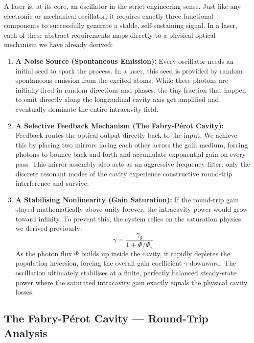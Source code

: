 A laser is, at its core, an oscillator in the strict engineering sense. Just like any electronic or mechanical oscillator, it requires exactly three functional components to successfully generate a stable, self-sustaining signal. In a laser, each of these abstract requirements maps directly to a physical optical mechanism we have already derived:

\begin{enumerate}
    \item \textbf{A Noise Source (Spontaneous Emission):} Every oscillator needs an initial seed to spark the process. In a laser, this seed is provided by random spontaneous emission from the excited atoms. While these photons are initially fired in random directions and phases, the tiny fraction that happen to emit directly along the longitudinal cavity axis get amplified and eventually dominate the entire intracavity field.

    \item \textbf{A Selective Feedback Mechanism (The Fabry-P\'{e}rot Cavity):} Feedback routes the optical output directly back to the input. We achieve this by placing two mirrors facing each other across the gain medium, forcing photons to bounce back and forth and accumulate exponential gain on every pass. This mirror assembly also acts as an aggressive frequency filter: only the discrete resonant modes of the cavity experience constructive round-trip interference and survive.

    \item \textbf{A Stabilising Nonlinearity (Gain Saturation):} If the round-trip gain stayed mathematically above unity forever, the intracavity power would grow toward infinity. To prevent this, the system relies on the saturation physics we derived previously:
          \begin{equation*}
              \gamma = \frac{\gamma_0}{1 + \Phi/\Phi_s}
          \end{equation*}
          As the photon flux $\Phi$ builds up inside the cavity, it rapidly depletes the population inversion, forcing the overall gain coefficient $\gamma$ downward. The oscillation ultimately stabilises at a finite, perfectly balanced steady-state power where the saturated intracavity gain exactly equals the physical cavity losses.
\end{enumerate}

\subsection{The Fabry-P\'{e}rot Cavity --- Round-Trip Analysis}


